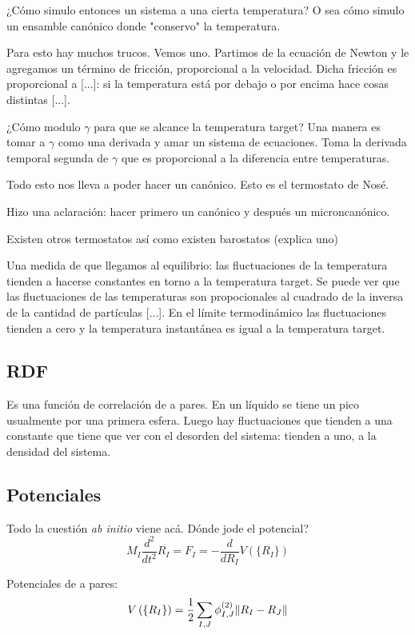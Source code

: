   ¿Cómo simulo entonces un sistema a una cierta temperatura? O sea cómo simulo un ensamble canónico donde "conservo" la temperatura.

  Para esto hay muchos trucos. Vemos uno. Partimos de la ecuación de Newton y le agregamos un término de fricción, proporcional a la velocidad. Dicha fricción es proporcional a [...]: si la temperatura está por debajo o por encima hace cosas distintas [...].

  ¿Cómo modulo $\gamma$ para que se alcance la temperatura target? Una manera es tomar a $\gamma$ como una derivada y amar un sistema de ecuaciones. Toma la derivada temporal segunda de $\gamma$ que es proporcional a la diferencia entre temperaturas.

  Todo esto nos lleva a poder hacer un canónico. Esto es el termostato de Nosé.

  Hizo una aclaración: hacer primero un canónico y después un microncanónico.

  Existen otros termostatos así como existen barostatos (explica uno)

  Una medida de que llegamos al equilibrio: las fluctuaciones de la temperatura tienden a hacerse constantes en torno a la temperatura target.  Se puede ver que las fluctuaciones de las temperaturas son propocionales al cuadrado de la inversa de la cantidad de partículas [...]. En el límite termodinámico las fluctuaciones tienden a cero y la temperatura instantánea es igual a la temperatura target.

\subsection{RDF}

  Es una función de correlación de a pares. En un líquido se tiene un pico usualmente por una primera esfera. Luego hay fluctuaciones que tienden a una constante que tiene que ver con el desorden del sistema: tienden a uno, a la densidad del sistema.


\subsection{Potenciales}

  Todo la cuestión \emph{ab initio} viene acá. Dónde jode el potencial?
    $$M_I \frac{d^2}{dt^2} R_I = F_I = - \frac{d}{dR_I} V \left( \{ R_I \}  \right)$$

  Potenciales de a pares:
    $$V \left( \{ R_I \}  \right) = \frac{1}{2} \sum_{I,J} \phi_{I,J}^{(2)} \norm{R_I - R_J}$$

